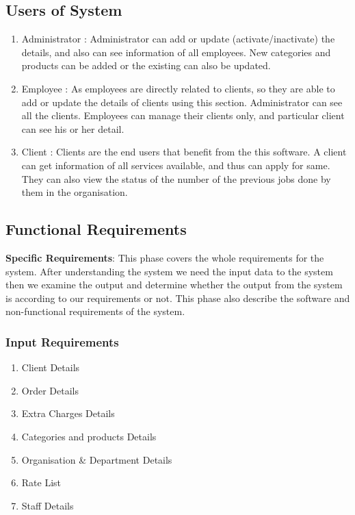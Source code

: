 \documentclass[12pt]{article}
\begin{document}
\subsection{Users of System}


\begin{enumerate}
\item Administrator : Administrator can add or update (activate/inactivate) the details, and
also can see information of all employees. New categories and products can be added
or the existing can also be updated.
\item  Employee : As employees are directly related to clients, so they are able to add or
update the details of clients using this section. Administrator can see all the clients.
Employees can manage their clients only, and particular client can see his or her detail.
\item  Client : Clients are the end users that benefit from the this software. A client can get
information of all services available, and thus can apply for same. They can also view
the status of the number of the previous jobs done by them in the organisation.
\end{enumerate}
\subsection{Functional Requirements}
\textbf { Specific Requirements}: This phase covers the whole requirements for the system. After
understanding the system we need the input data to the system then we examine the output
and determine whether the output from the system is according to our requirements or not.
This phase also describe the software and non-functional requirements of the system.\\ 


\subsubsection {Input Requirements}
\begin{enumerate}
\item Client Details
\item  Order Details
\item  Extra Charges Details
\item  Categories and products Details
\item  Organisation & Department Details
\item  Rate List
\item  Staff Details
\end{enumerate}
\end{document}
